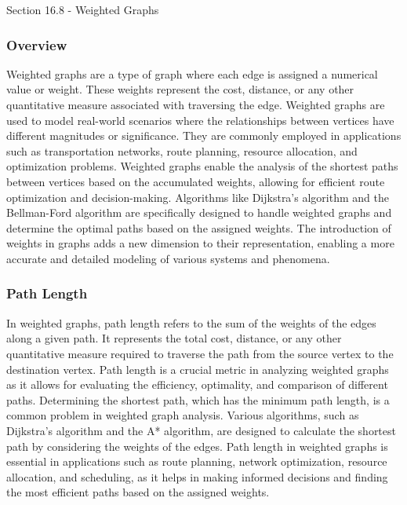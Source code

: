 \begin{notes}{Section 16.8 - Weighted Graphs}
    \subsubsection*{Overview}

    Weighted graphs are a type of graph where each edge is assigned a numerical value or weight. These weights represent the cost, distance, or any other quantitative measure associated with traversing the edge. 
    Weighted graphs are used to model real-world scenarios where the relationships between vertices have different magnitudes or significance. They are commonly employed in applications such as transportation networks, 
    route planning, resource allocation, and optimization problems. Weighted graphs enable the analysis of the shortest paths between vertices based on the accumulated weights, allowing for efficient route optimization 
    and decision-making. Algorithms like Dijkstra's algorithm and the Bellman-Ford algorithm are specifically designed to handle weighted graphs and determine the optimal paths based on the assigned weights. The 
    introduction of weights in graphs adds a new dimension to their representation, enabling a more accurate and detailed modeling of various systems and phenomena.
    
    \subsubsection*{Path Length}
    
    In weighted graphs, path length refers to the sum of the weights of the edges along a given path. It represents the total cost, distance, or any other quantitative measure required to traverse the path from the 
    source vertex to the destination vertex. Path length is a crucial metric in analyzing weighted graphs as it allows for evaluating the efficiency, optimality, and comparison of different paths. Determining the 
    shortest path, which has the minimum path length, is a common problem in weighted graph analysis. Various algorithms, such as Dijkstra's algorithm and the A* algorithm, are designed to calculate the shortest path 
    by considering the weights of the edges. Path length in weighted graphs is essential in applications such as route planning, network optimization, resource allocation, and scheduling, as it helps in making informed 
    decisions and finding the most efficient paths based on the assigned weights.
    

\end{notes}
